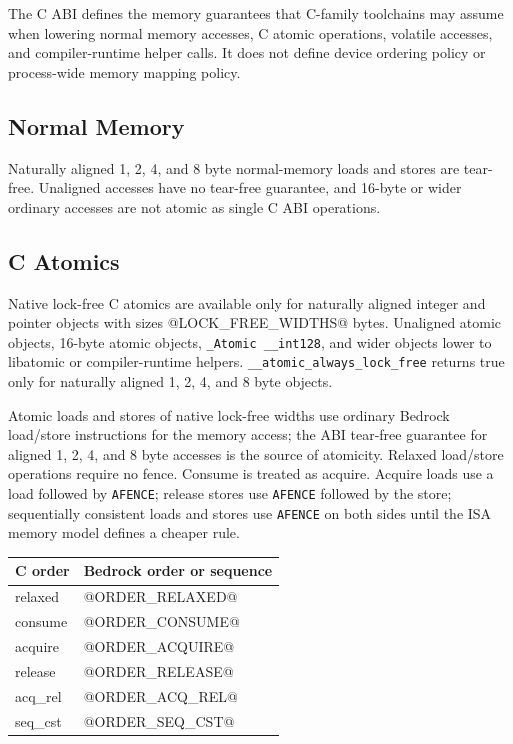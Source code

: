 The C ABI defines the memory guarantees that C-family toolchains may assume
when lowering normal memory accesses, C atomic operations, volatile accesses,
and compiler-runtime helper calls. It does not define device ordering policy or
process-wide memory mapping policy.

\subsection{Normal Memory}
Naturally aligned 1, 2, 4, and 8 byte normal-memory loads and stores are
tear-free. Unaligned accesses have no tear-free guarantee, and 16-byte or wider
ordinary accesses are not atomic as single C ABI operations.

\subsection{C Atomics}
Native lock-free C atomics are available only for naturally aligned integer and
pointer objects with sizes @LOCK_FREE_WIDTHS@ bytes. Unaligned atomic objects,
16-byte atomic objects, \texttt{\_Atomic \_\_int128}, and wider objects lower to
libatomic or compiler-runtime helpers.
\texttt{\_\_atomic\_always\_lock\_free} returns true only for naturally aligned
1, 2, 4, and 8 byte objects.

Atomic loads and stores of native lock-free widths use ordinary Bedrock
load/store instructions for the memory access; the ABI tear-free guarantee for
aligned 1, 2, 4, and 8 byte accesses is the source of atomicity. Relaxed
load/store operations require no fence. Consume is treated as acquire. Acquire
loads use a load followed by \texttt{AFENCE}; release stores use
\texttt{AFENCE} followed by the store; sequentially consistent loads and stores
use \texttt{AFENCE} on both sides until the ISA memory model defines a cheaper
rule.

\begingroup\footnotesize
\setlength{\tabcolsep}{2pt}
\begin{longtable}{@{}p{1.55in}p{3.95in}@{}}
\toprule
\textbf{C order} & \textbf{Bedrock order or sequence}\\
\midrule
\endhead
relaxed & @ORDER_RELAXED@\\
consume & @ORDER_CONSUME@\\
acquire & @ORDER_ACQUIRE@\\
release & @ORDER_RELEASE@\\
acq\_rel & @ORDER_ACQ_REL@\\
seq\_cst & @ORDER_SEQ_CST@\\
\bottomrule
\end{longtable}
\endgroup

